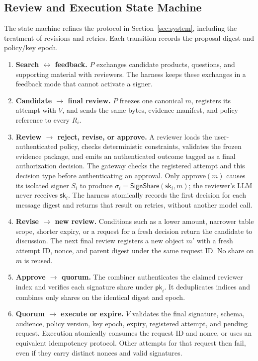 \documentclass{article}
\newcommand{\sk}{\mathsf{sk}}
\newcommand{\pk}{\mathsf{pk}}
\begin{document}
\subsection{Review and Execution State Machine}
The state machine refines the protocol in Section~\ref{sec:system}, including
the treatment of revisions and retries. Each transition records the proposal
digest and policy/key epoch.
\begin{enumerate}[leftmargin=1.6em,itemsep=2pt,topsep=2pt]
  \item \textbf{Search $\leftrightarrow$ feedback.} $P$ exchanges candidate
  products, questions, and supporting material with reviewers. The harness
  keeps these exchanges in a feedback mode that cannot activate a signer.
  \item \textbf{Candidate $\rightarrow$ final review.} $P$ freezes one canonical
  $m$, registers its attempt with $V$, and sends the same bytes, evidence
  manifest, and policy reference to every $R_i$.
  \item \textbf{Review $\rightarrow$ reject, revise, or approve.} A reviewer
  loads the user-authenticated policy, checks deterministic constraints,
  validates the frozen evidence package, and emits an authenticated outcome
  tagged as a final authorization decision. The gateway checks the registered
  attempt and this decision type before authenticating an approval.
  Only approve$(m)$ causes its isolated signer $S_i$ to produce
  $\sigma_i=\mathsf{SignShare}(\sk_i,m)$; the reviewer's LLM never receives
  $\sk_i$.
  The harness atomically records the first decision for each message digest and
  returns that result on retries, without another model call.
  \item \textbf{Revise $\rightarrow$ new review.} Conditions such as a lower
  amount, narrower table scope, shorter expiry, or a request for a fresh decision
  return the candidate to discussion. The next final review registers a new
  object $m'$ with a fresh attempt ID, nonce, and parent digest under the same
  request ID. No share on $m$ is reused.
  \item \textbf{Approve $\rightarrow$ quorum.} The combiner authenticates the
  claimed reviewer index and verifies each signature share under $\pk_i$. It deduplicates
  indices and combines only shares on the identical digest and epoch.
  \item \textbf{Quorum $\rightarrow$ execute or expire.} $V$ validates the final
  signature, schema, audience, policy version, key epoch, expiry, registered
  attempt, and pending request. Execution atomically consumes the request ID
  and nonce, or uses an equivalent idempotency protocol. Other attempts for
  that request then fail, even if they carry distinct nonces and valid signatures.
\end{enumerate}
\end{document}
